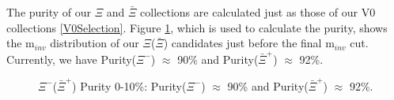 \documentclass[../AnalysisNoteJBuxton.tex]{subfiles}
\begin{document}
The purity of our $\Xi$ and $\bar{\Xi}$ collections are calculated just as those of our V0 collections \ref{V0Selection}.
Figure \ref{fig:XiPurity}, which is used to calculate the purity, shows the m$_{inv}$ distribution of our $\Xi$($\bar{\Xi}$) candidates just before the final m$_{inv}$ cut.  Currently, we have Purity($\Xi^{-}$) $\approx$ 90\% and Purity($\bar{\Xi}^{+}$) $\approx$ 92\%.

\begin{figure}[h!]
  \centering
  \caption[$\Xi^{-}$($\bar{\Xi}^{+}$) Purity]{$\Xi^{-}$($\bar{\Xi}^{+}$) Purity 0-10\%:  Purity($\Xi^{-}$) $\approx$ 90\% and Purity($\bar{\Xi}^{+}$) $\approx$ 92\%.}
  \label{fig:XiPurity}
\end{figure}
\end{document}
